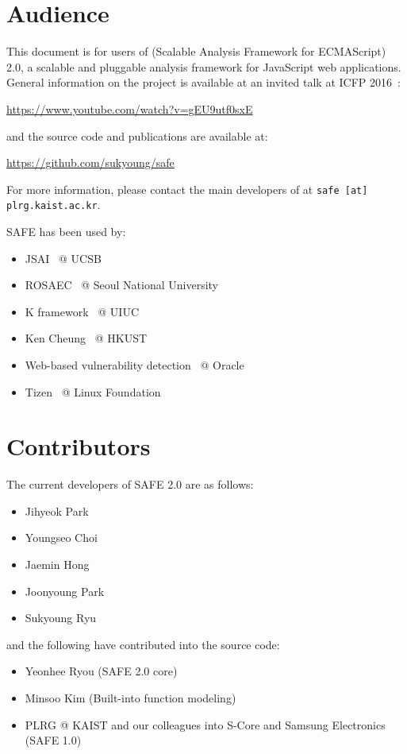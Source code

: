 \section{Audience}
This document is for users of \safe (Scalable Analysis Framework for ECMAScript)
2.0, a scalable and pluggable analysis framework for JavaScript web applications.
General information on the \safe project is available at an invited talk at ICFP 2016~\cite{safeicfp16}:
\begin{center}
  \url{https://www.youtube.com/watch?v=gEU9utf0sxE}
\end{center}
and the source code and publications are available at:
\begin{center}
  \url{https://github.com/sukyoung/safe}
\end{center}
For more information, please contact the main developers of \safe
at \texttt{safe [at] plrg.kaist.ac.kr}.

SAFE has been used by:
\begin{itemize}
\itemsep-.2em
\item JSAI~\cite{jsai} @ UCSB
\item ROSAEC~\cite{rosaec} @ Seoul National University
\item K framework~\cite{kjs} @ UIUC
\item Ken Cheung~\cite{emse16} @ HKUST
\item Web-based vulnerability detection~\cite{oracle} @ Oracle
\item Tizen~\cite{tizen} @ Linux Foundation
\end{itemize}

\section{Contributors}
The current developers of SAFE 2.0 are as follows:
\begin{itemize}
\itemsep-.2em
\item Jihyeok Park
\item Youngseo Choi
\item Jaemin Hong
\item Joonyoung Park
\item Sukyoung Ryu
\end{itemize}
and the following have contributed into the source code:
\begin{itemize}
\itemsep-.1em
\item Yeonhee Ryou (SAFE 2.0 core)
\item Minsoo Kim (Built-into function modeling)
\item PLRG @ KAIST and our colleagues into S-Core and Samsung Electronics (SAFE 1.0)
\end{itemize}


